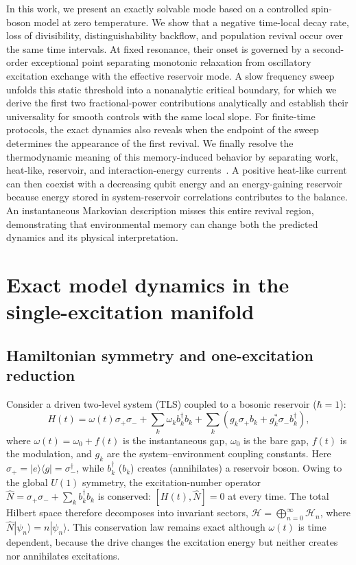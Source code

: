 \documentclass[reprint,superscriptaddress,floatfix,amsmath,amssymb,prresearch,aps]{revtex4-2}
\begin{document}
In this work, we present an exactly solvable mode based on a controlled spin-boson model at zero temperature. We show that a negative time-local decay rate, loss of divisibility, distinguishability backflow, and population revival occur over the same time intervals. At fixed resonance, their onset is governed by a second-order exceptional point separating monotonic relaxation from oscillatory excitation exchange with the effective reservoir mode. A slow frequency sweep unfolds this static threshold into a nonanalytic critical boundary, for which we derive the first two fractional-power contributions analytically and establish their universality for smooth controls with the same local slope. For finite-time protocols, the exact dynamics also reveals when the endpoint of the sweep determines the appearance of the first revival. We finally resolve the thermodynamic meaning of this memory-induced behavior by separating work, heat-like, reservoir, and interaction-energy currents~\cite{TalknerHanggi2020,Campbell2018}. A positive heat-like current can then coexist with a decreasing qubit energy and an energy-gaining reservoir because energy stored in system-reservoir correlations contributes to the balance. An instantaneous Markovian description misses this entire revival region, demonstrating that environmental memory can change both the predicted dynamics and its physical interpretation.

\section{Exact model dynamics in the single-excitation manifold}
\label{sec:model}

\subsection{Hamiltonian symmetry and one-excitation reduction}
Consider a driven two-level system (TLS) coupled to a bosonic reservoir
(\(\hbar=1\)):
\begin{equation}
H(t)=\omega(t)\sigma_+\sigma_-
+\sum_k\omega_k b_k^\dagger b_k
+\sum_k\left(g_k\sigma_+b_k+g_k^*\sigma_-b_k^\dagger\right),
\label{eq:Hamiltonian}
\end{equation}
where \(\omega(t)=\omega_0+f(t)\) is the instantaneous gap,
\(\omega_0\) is the bare gap, \(f(t)\) is the modulation, and \(g_k\) are
the system--environment coupling constants. Here
\(\sigma_+=|e\rangle\langle g|=\sigma_-^\dagger\), while
\(b_k^\dagger\) (\(b_k\)) creates (annihilates) a reservoir boson. Owing to
the global \(U(1)\) symmetry, the excitation-number operator
\(\hat N=\sigma_+\sigma_-+\sum_k b_k^\dagger b_k\) is conserved:
\([H(t),\hat N]=0\) at every time. The total Hilbert space therefore
decomposes into invariant sectors,
\(\mathcal H=\bigoplus_{n=0}^\infty\mathcal H_n\), where
\(\hat N|\psi_n\rangle=n|\psi_n\rangle\). This conservation law remains
exact although \(\omega(t)\) is time dependent, because the drive changes the
excitation energy but neither creates nor
annihilates excitations.
\end{document}

